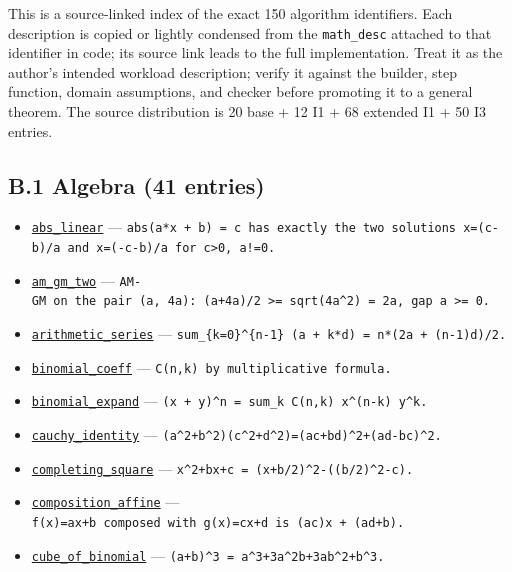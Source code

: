 \documentclass[
  10pt,
]{article}
\providecommand{\tightlist}{%
  \setlength{\itemsep}{0pt}\setlength{\parskip}{0pt}}
\begin{document}
This is a source-linked index of the exact 150 algorithm identifiers.
Each description is copied or lightly condensed from the
\texttt{math\_desc} attached to that identifier in code; its source link
leads to the full implementation. Treat it as the author's intended
workload description; verify it against the builder, step function,
domain assumptions, and checker before promoting it to a general
theorem. The source distribution is 20 base + 12 I1 + 68 extended I1 +
50 I3 entries.

\subsection{B.1 Algebra (41 entries)}\label{b.1-algebra-41-entries}

\begin{itemize}
\tightlist
\item
  \href{../generation_1/I3/algos_i3.py}{\texttt{abs\_linear}} ---
  \texttt{abs(a*x\ +\ b)\ =\ c\ has\ exactly\ the\ two\ solutions\ x=(c-b)/a\ and\ x=(-c-b)/a\ for\ c\textgreater{}0,\ a!=0.}
\item
  \href{../generation_1/I3/algos_i3.py}{\texttt{am\_gm\_two}} ---
  \texttt{AM-GM\ on\ the\ pair\ (a,\ 4a):\ (a+4a)/2\ \textgreater{}=\ sqrt(4a\^{}2)\ =\ 2a,\ gap\ a\ \textgreater{}=\ 0.}
\item
  \href{../tools/prm/algos.py}{\texttt{arithmetic\_series}} ---
  \texttt{sum\_\{k=0\}\^{}\{n-1\}\ (a\ +\ k*d)\ =\ n*(2a\ +\ (n-1)d)/2.}
\item
  \href{../generation_1/I1/algos_gen1_big.py}{\texttt{binomial\_coeff}}
  --- \texttt{C(n,k)\ by\ multiplicative\ formula.}
\item
  \href{../tools/prm/algos.py}{\texttt{binomial\_expand}} ---
  \texttt{(x\ +\ y)\^{}n\ =\ sum\_k\ C(n,k)\ x\^{}(n-k)\ y\^{}k.}
\item
  \href{../generation_1/I1/algos_gen1_big.py}{\texttt{cauchy\_identity}}
  --- \texttt{(a\^{}2+b\^{}2)(c\^{}2+d\^{}2)=(ac+bd)\^{}2+(ad-bc)\^{}2.}
\item
  \href{../generation_1/I1/algos_gen1_big.py}{\texttt{completing\_square}}
  --- \texttt{x\^{}2+bx+c\ =\ (x+b/2)\^{}2-((b/2)\^{}2-c).}
\item
  \href{../generation_1/I3/algos_i3.py}{\texttt{composition\_affine}}
  ---
  \texttt{f(x)=ax+b\ composed\ with\ g(x)=cx+d\ is\ (ac)x\ +\ (ad+b).}
\item
  \href{../generation_1/I1/algos_gen1_ext.py}{\texttt{cube\_of\_binomial}}
  --- \texttt{(a+b)\^{}3\ =\ a\^{}3+3a\^{}2b+3ab\^{}2+b\^{}3.}

\end{itemize}
\end{document}
